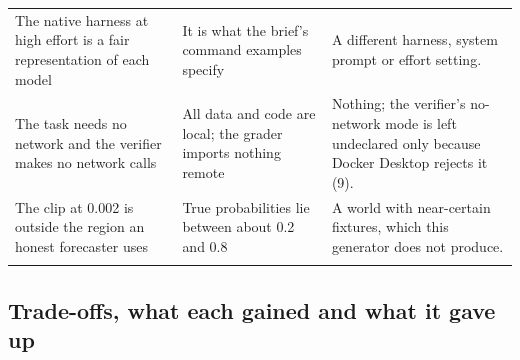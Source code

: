 \documentclass[11pt,letterpaper]{article}
\begin{document}
\begin{small}
\begin{longtable}{>{\raggedright\arraybackslash}p{}>{\raggedright\arraybackslash}p{}>{\raggedright\arraybackslash}p{}}
The native harness at high effort is a fair representation of each model & It is what the brief's command examples specify & A different harness, system prompt or effort setting. \\ \addlinespace[2pt]
The task needs no network and the verifier makes no network calls & All data and code are local; the grader imports nothing remote & Nothing; the verifier's no-network mode is left undeclared only because Docker Desktop rejects it (9). \\ \addlinespace[2pt]
The clip at 0.002 is outside the region an honest forecaster uses & True probabilities lie between about 0.2 and 0.8 & A world with near-certain fixtures, which this generator does not produce. \\ \addlinespace[2pt]
\end{longtable}
\end{small}

\subsection{Trade-offs, what each gained and what it gave up}
\end{document}
